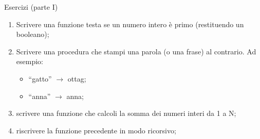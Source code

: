 \begin{frame}{Esercizi (parte I)}

  \begin{enumerate}
    \item Scrivere una funzione testa se un numero intero è primo (restituendo un booleano);
    \item Scrivere una procedura che stampi una parola (o una frase)
    al contrario. Ad esempio:
    \begin{itemize}
      \item ``gatto'' $\rightarrow$ ottag;
      \item ``anna'' $\rightarrow$ anna;
    \end{itemize}
    \item scrivere una funzione che calcoli la somma dei numeri interi da 1 a N;
    \item riscrivere la funzione precedente in modo ricorsivo;
  \end{enumerate}
\end{frame}
